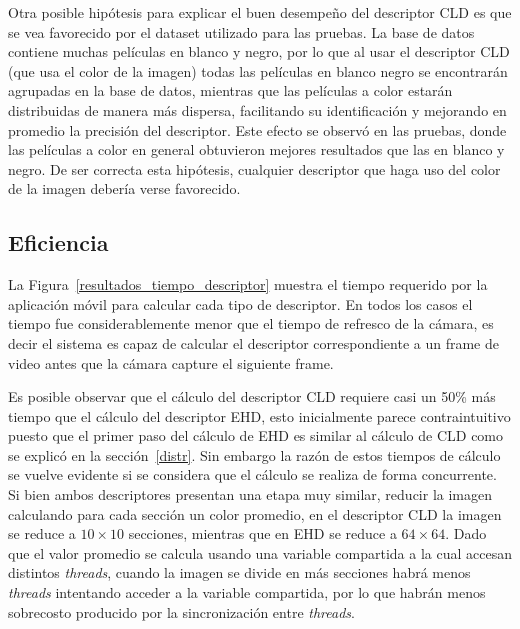 Otra posible hipótesis para explicar el buen desempeño del descriptor CLD es que se vea favorecido por el dataset utilizado para las pruebas. La base de datos contiene muchas películas en blanco y negro, por lo que al usar el descriptor CLD (que usa el color de la imagen) todas las películas en blanco negro se encontrarán agrupadas en la base de datos, mientras que las películas a color estarán distribuidas de manera más dispersa, facilitando su identificación y mejorando en promedio la precisión del descriptor. Este efecto se observó en las pruebas, donde las películas a color en general obtuvieron mejores resultados que las en blanco y negro. De ser correcta esta hipótesis, cualquier descriptor que haga uso del color de la imagen debería verse favorecido.

\subsection{Eficiencia}
La Figura~\ref{resultados_tiempo_descriptor} muestra el tiempo requerido por la aplicación móvil para calcular cada tipo de descriptor. En todos los casos el tiempo fue considerablemente menor que el tiempo de refresco de la cámara, es decir el sistema es capaz de calcular el descriptor correspondiente a un frame de video antes que la cámara capture el siguiente frame.

Es posible observar que el cálculo del descriptor CLD requiere casi un 50\% más tiempo que el cálculo del descriptor EHD, esto inicialmente parece contraintuitivo puesto que el primer paso del cálculo de EHD es similar al cálculo de CLD como se explicó en la sección~\ref{distr}. Sin embargo la razón de estos tiempos de cálculo se vuelve evidente si se considera que el cálculo se realiza de forma concurrente. Si bien ambos descriptores presentan una etapa muy similar, reducir la imagen calculando para cada sección un color promedio, en el descriptor CLD la imagen se reduce a $10 \times 10$ secciones, mientras que en EHD se reduce a $64 \times 64$. Dado que el valor promedio se calcula usando una variable compartida a la cual accesan distintos \emph{threads}, cuando la imagen se divide en más secciones habrá menos \emph{threads} intentando acceder a la variable compartida, por lo que habrán menos sobrecosto producido por la sincronización entre \emph{threads}. 

